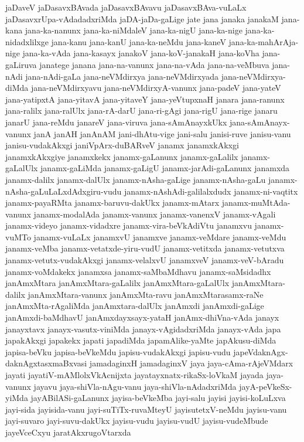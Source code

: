 {jaDaveV
jaDasavxBAvada
jaDasavxBAvavu
jaDasavxBAva-vuLaLx
jaDasavxrUpa-vAdadadxriMda
jaDA-jaDa-gaLige
jate
jana
janaka
janakaM
jana-kana
jana-ka-nanunx
jana-ka-niMdaleV
jana-ka-nigU
jana-ka-nige
jana-ka-nidadxlilxge
jana-kanu
jana-kanU
jana-ka-neMdu
jana-kaneV
jana-ka-mahArAja-nige
jana-ka-vAda
jana-kasayx
janakoV
jana-koV-janakaH
jana-koVha
jana-gaLiruva
janatege
janana
jana-na-vanunx
jana-na-vAda
jana-na-veMbuva
jana-nAdi
jana-nAdi-gaLa
jana-neVMdirxya
jana-neVMdirxyada
jana-neVMdirxya-diMda
jana-neVMdirxyavu
jana-neVMdirxyA-vanunx
jana-padeV
jana-yateV
jana-yatipxtA
jana-yitavA
jana-yitaveY
jana-yeVtupxnaH
janara
jana-ranunx
jana-ralilx
jana-ralUlx
jana-rA-darU
jana-ri-gAgi
jana-rigU
jana-rige
janaru
janarU
jana-reMdu
janareV
jana-viruva
jana-sAmAnayxkUkx
jana-sAmAnayx-vanunx
janA
janAH
janAnAM
jani-dhAtu-vige
jani-salu
janisi-ruve
janisu-vanu
janisu-vudakAkxgi
janiVpArx-duBARveV
janamx
janamxkAkxgi
janamxkAkxgiye
janamxkekx
janamx-gaLanunx
janamx-gaLalilx
janamx-gaLalUlx
janamx-gaLiMda
janamx-gaLigU
janamx-jarAdi-gaLanunx
janamxda
janamx-dalilx
janamx-dalUlx
janamx-nAsha-gaLige
janamx-nAsha-gaLu
janamx-nAsha-gaLuLaLxdAdxgiru-vudu
janamx-nAshAdi-galilalxdudx
janamx-ni-vaqtitx
janamx-payaRMta
janamx-baruvu-dakUkx
janamx-mAtarx
janamx-muMtAda-vanunx
janamx-modalAda
janamx-vanunx
janamx-vanenxV
janamx-vAgali
janamx-videyo
janamx-vidadxre
janamx-vira-beVkAdiVtu
janamxvu
janamx-vuMTo
janamx-vuLaLx
janamxvU
janamxve
janamx-veMdare
janamx-veMdu
janamx-veMba
janamx-vetatxde-yiru-vudU
janamx-vetitxda
janamx-vetutxva
janamx-vetutx-vudakAkxgi
janamx-velalxvU
janamxveV
janamx-veV-bAradu
janamx-voMdakekx
janamxsa
janamx-saMbaMdhavu
janamx-saMsidadhx
janAmxMtara
janAmxMtara-gaLalilx
janAmxMtara-gaLalUlx
janAmxMtara-dalilx
janAmxMtara-vanunx
janAmxMta-ravu
janAmxMtarasamx-raNe
janAmxMta-rAgaliMda
janAmxtara-dalUlx
janAmxdi
janAmxdi-gaLige
janAmxdi-baMdhavU
janAmxdayxsayx-yataH
janAmx-dhiVna-vAda
janayx
janayxtavx
janayx-vasutx-viniMda
janayx-vAgidadxriMda
janayx-vAda
japa
japakAkxgi
japakekx
japati
japadiMda
japamAlike-yaMte
japAkusu-diMda
japisa-beVku
japisa-beVkeMdu
japisu-vudakAkxgi
japisu-vudu
japeVdaknAgx-daknAgxtasxmaBxvasi
jamadaginxH
jamadaginxV
jaya
jaya-cAma-rAjeVMdarx
jayati
jayatiV-mAMlolxVkAcnijxta
jayatayxnatx-rikaSx-loVkaM
jayada
jaya-vanunx
jayavu
jaya-shiVla-nAgu-vanu
jaya-shiVla-nAdadxriMda
jayA-peVkeSx-yiMda
jayABilASi-gaLanunx
jayisa-beVkeMba
jayi-salu
jayisi
jayisi-koLuLxva
jayi-sida
jayisida-vanu
jayi-suTiTx-ruvaMteyU
jayisutetxV-neMdu
jayisu-vanu
jayi-suvaro
jayi-suvu-dakUkx
jayisu-vudu
jayisu-vudU
jayisu-vudeMbude
jayeVceCxyu
jaratAkxrugoVtarxda
}
